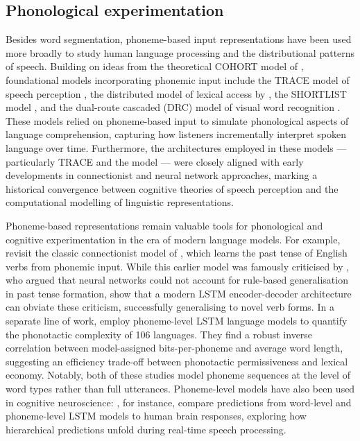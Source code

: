 \subsection{Phonological experimentation}\label{sec:12-phonexperiment}

Besides word segmentation, phoneme-based input representations have been used more broadly to study human language processing and the distributional patterns of speech. Building on ideas from the theoretical COHORT model of \citet{MARSLENWILSON1978}, foundational models incorporating phonemic input include the TRACE model of speech perception \citep{mcclelland1986trace}, the distributed model of lexical access by \citet{seidenberg1989distributed}, the SHORTLIST model \citep{norris1994shortlist}, and the dual-route cascaded (DRC) model of visual word recognition \citep{coltheart2001drc}. These models relied on phoneme-based input to simulate phonological aspects of language comprehension, capturing how listeners incrementally interpret spoken language over time. Furthermore, the architectures employed in these models --- particularly TRACE and the \citet{seidenberg1989distributed} model --- were closely aligned with early developments in connectionist and neural network approaches, marking a historical convergence between cognitive theories of speech perception and the computational modelling of linguistic representations.

Phoneme-based representations remain valuable tools for phonological and cognitive experimentation in the era of modern language models. For example, \citet{kirov-2018-recurrent} revisit the classic connectionist model of \citet{Rumelhart1986}, which learns the past tense of English verbs from phonemic input. While this earlier model was famously criticised by \citet{pinker_language_1988}, who argued that neural networks could not account for rule-based generalisation in past tense formation, \citet{kirov-2018-recurrent} show that a modern LSTM encoder-decoder architecture can obviate these criticism, successfully generalising to novel verb forms. In a separate line of work, \citet{pimentel2020phonotactic} employ phoneme-level LSTM language models to quantify the phonotactic complexity of 106 languages. They find a robust inverse correlation between model-assigned bits-per-phoneme and average word length, suggesting an efficiency trade-off between phonotactic permissiveness and lexical economy. Notably, both of these studies model phoneme sequences at the level of word types rather than full utterances. Phoneme-level models have also been used in cognitive neuroscience: \citet{donhauser2020two}, for instance, compare predictions from word-level and phoneme-level LSTM models to human brain responses, exploring how hierarchical predictions unfold during real-time speech processing.%


